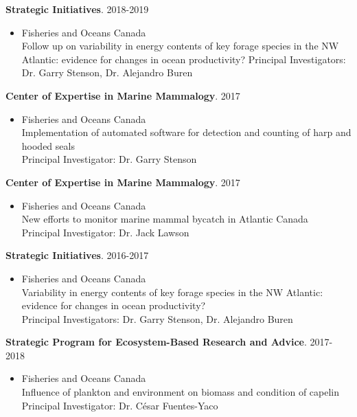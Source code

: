 \documentclass{res}
\begin{document}
\begin{resume}
\textbf{Strategic Initiatives}. 2018-2019
\begin{itemize} %
	\item[] Fisheries and Oceans Canada\\
Follow up on variability in energy contents of key forage species in the NW Atlantic: evidence for changes in ocean productivity?
Principal Investigators: Dr. Garry Stenson, Dr. Alejandro Buren
\end{itemize}

\textbf{Center of Expertise in Marine Mammalogy}. 2017
\begin{itemize} %
	\item[] Fisheries and Oceans Canada\\
Implementation of automated software for detection and counting of harp and hooded seals \\
Principal Investigator: Dr. Garry Stenson
\end{itemize}

\textbf{Center of Expertise in Marine Mammalogy}. 2017
\begin{itemize} %
	\item[] Fisheries and Oceans Canada\\
New efforts to monitor marine mammal bycatch in Atlantic Canada\\
Principal Investigator: Dr. Jack Lawson
\end{itemize}

\textbf{Strategic Initiatives}. 2016-2017
\begin{itemize} %
	\item[]Fisheries and Oceans Canada\\
Variability in energy contents of key forage species in the NW Atlantic: evidence for changes in ocean productivity?\\
Principal Investigators: Dr. Garry Stenson, Dr. Alejandro Buren
\end{itemize}

\textbf{Strategic Program for Ecosystem-Based Research and Advice}. 2017-2018
\begin{itemize} %
	\item[]Fisheries and Oceans Canada\\
Influence of plankton and environment on biomass and condition of capelin\\
Principal Investigator: Dr. César Fuentes-Yaco
\end{itemize}


\end{resume}
\end{document}

